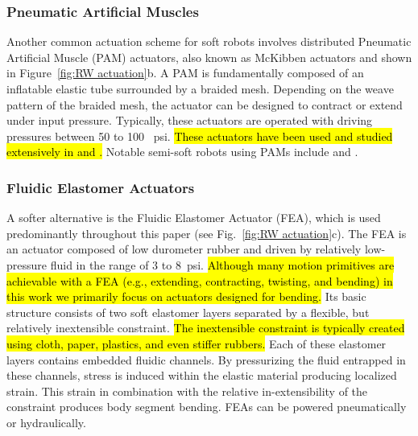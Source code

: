 \subsubsection{Pneumatic Artificial Muscles}
\label{subsubsec:RW PMA}
Another common actuation scheme for soft robots involves distributed Pneumatic Artificial Muscle (PAM) actuators, also known as McKibben actuators and shown in Figure~\ref{fig:RW actuation}b.
A PAM is fundamentally composed of an inflatable elastic tube surrounded by a braided mesh.
Depending on the weave pattern of the braided mesh, the actuator can be designed to contract or extend under input pressure.
Typically, these actuators are operated with driving pressures between 50 to 100 ~psi.
\hl{These actuators have been used and studied extensively in \mbox{\citet{chou1996measurement, tondu2000modeling}} \mbox{\citet{caldwell2000bio, daerden2002pneumatic}} and \mbox{\citet{reynolds2003modeling}}.}
Notable semi-soft robots using PAMs include \citet{mcmahan2006field, pritts2004design} and \citet{kang2013design}.

\subsubsection{Fluidic Elastomer Actuators}
\label{subsubsec:RW FEA}
A softer alternative is the Fluidic Elastomer Actuator (FEA), which is used predominantly throughout this paper (see Fig.~\ref{fig:RW actuation}c).
The FEA is an actuator composed of low durometer rubber and driven by relatively low-pressure fluid in the range of 3 to 8~psi.
\hl{Although many motion primitives are achievable with a FEA (e.g., extending, contracting, twisting, and bending) in this work we primarily focus on actuators designed for bending.}
Its basic structure consists of two soft elastomer layers separated by a flexible, but relatively inextensible constraint.
\hl{The inextensible constraint is typically created using cloth, paper, plastics, and even stiffer rubbers.}
Each of these elastomer layers contains embedded fluidic channels.
By pressurizing the fluid entrapped in these channels, stress is induced within the elastic material producing localized strain. This strain in combination with the relative in-extensibility of the constraint produces body segment bending.
FEAs can be powered pneumatically or hydraulically.

